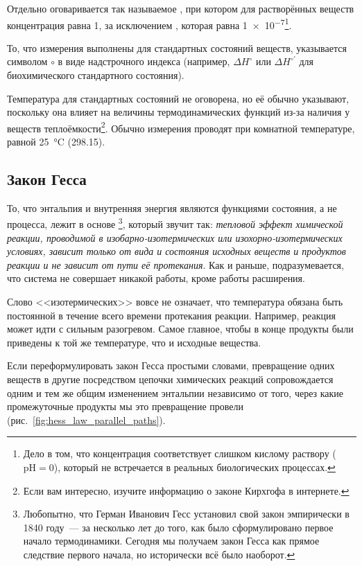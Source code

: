 Отдельно оговаривается так называемое , при котором для растворённых веществ концентрация равна \qty{1}{\ruMolar}, за исключением \ce{[H+]}, которая равна \qty{1e-7}{\ruMolar}\footnote{Дело в том, что концентрация  соответствует слишком кислому раствору ($\mathrm{pH} = 0$), который не встречается в реальных биологических процессах.}.

То, что измерения выполнены для стандартных состояний веществ, указывается символом $\circ$ в виде надстрочного индекса (например, $\Delta H^{\circ}$ или $\Delta H^{\circ\prime}$ для биохимического стандартного состояния).

Температура для стандартных состояний не оговорена, но её обычно указывают, поскольку она влияет на величины термодинамических функций из-за наличия у веществ теплоёмкости\footnote{Если вам интересно, изучите информацию о законе Кирхгофа в интернете.}. Обычно измерения проводят при комнатной температуре, равной \qty{25}{\degreeCelsius} (\qty{298,15}{\ruK}).

\subsection*{Закон Гесса}

То, что энтальпия и внутренняя энергия являются функциями состояния, а не процесса, лежит в основе \footnote{Любопытно, что Герман Иванович Гесс установил свой закон эмпирически в 1840 году~--- за несколько лет до того, как было сформулировано первое начало термодинамики. Сегодня мы получаем закон Гесса как прямое следствие первого начала, но исторически всё было наоборот.}, который звучит так: \emph{тепловой эффект химической реакции, проводимой в изобарно-изотермических или изохорно-изотермических условиях, зависит только от вида и состояния исходных веществ и продуктов реакции и не зависит от пути её протекания}. Как и раньше, подразумевается, что система не совершает никакой работы, кроме работы расширения.

Слово <<изотермических>> вовсе не означает, что температура обязана быть постоянной в течение всего времени протекания реакции. Например, реакция может идти с сильным разогревом. Самое главное, чтобы в конце продукты были приведены к той же температуре, что и исходные вещества.

Если переформулировать закон Гесса простыми словами, превращение одних веществ в другие посредством цепочки химических реакций сопровождается одним и тем же общим изменением энтальпии независимо от того, через какие промежуточные продукты мы это превращение провели (рис.~\ref{fig:hess_law_parallel_paths}).

